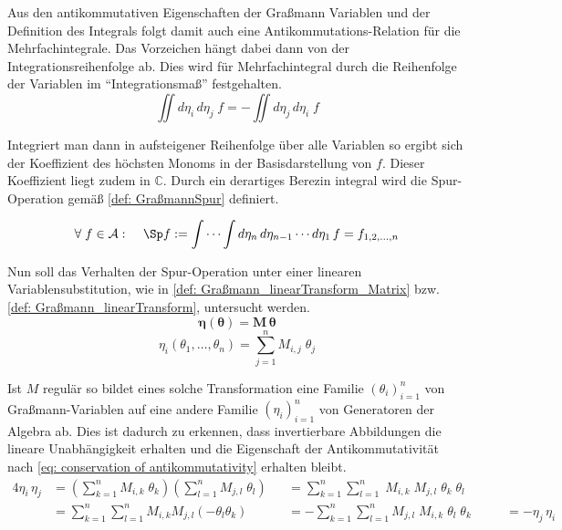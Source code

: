 \noindent Aus den antikommutativen Eigenschaften der Graßmann Variablen und der Definition des Integrals folgt damit auch eine Antikommutations-Relation für die Mehrfachintegrale. Das Vorzeichen hängt dabei dann von der Integrationsreihenfolge ab. Dies wird für Mehrfachintegral durch die Reihenfolge der Variablen im ``Integrationsmaß'' festgehalten.
\begin{equation}
\iint d \eta_{i}\, d \eta_{j}\; f = - \iint d \eta_{j}\, d \eta_{i}\; f
\end{equation}

\noindent Integriert man dann in aufsteigener Reihenfolge über alle Variablen so ergibt sich der Koeffizient des höchsten Monoms in der Basisdarstellung von $f$. Dieser Koeffizient liegt zudem in $\mathbb C$. Durch ein derartiges Berezin integral wird die Spur-Operation gemäß \eqref{def: GraßmannSpur} definiert. 
\begin{grayframe}[frametitle = {Definition: Spur-Operation}]
    \begin{equation} \label{def: GraßmannSpur}
        \forall \;f\in \mathcal A : \;\;\;\; \Sp f := \int \cdots \int d\eta_n\,d\eta_{n-1}\cdots d\eta_1\, f = f_{1,2,\dots,n}
    \end{equation}
\end{grayframe}

\noindent Nun soll das Verhalten der Spur-Operation unter einer linearen Variablensubstitution, wie in \eqref{def: Graßmann_linearTransform_Matrix} bzw. \eqref{def: Graßmann_linearTransform}, untersucht werden. 
\begin{equation} \label{def: Graßmann_linearTransform_Matrix}
    \bm{\eta}\left(\bm{\theta}\right) = \bm{M}\,\bm{\theta}
\end{equation}
\begin{equation} \label{def: Graßmann_linearTransform}
    \eta_i\left( \theta_1,\dots,\theta_n \right) = \sum_{j=1}^n M_{i,j}\; \theta_j
\end{equation}

\noindent Ist $M$ regulär so bildet eines solche Transformation eine Familie $\left(\theta_i\right)_{i = 1}^n$ von Graßmann-Variablen auf eine andere Familie $\left(\eta_i\right)_{i = 1}^n$ von Generatoren der Algebra ab. Dies ist dadurch zu erkennen, dass invertierbare Abbildungen die lineare Unabhängigkeit erhalten und die Eigenschaft der Antikommutativität nach \eqref{eq: conservation of antikommutativity} erhalten bleibt.
\begin{alignat}{4}
    \eta_i \,\eta_j 
        &= \left(\sum_{k=1}^n M_{i,k} \; \theta_k  \right) \left(\sum_{l=1}^n M_{j,l} \;\theta_l\right)     
        &&= \sum_{k=1}^n \sum_{l=1}^n\; M_{i,k}\; M_{j,l} \;\theta_k \;\theta_l &&& \nonumber \\
        &= \sum_{k=1}^n \sum_{l=1}^n M_{i,k} M_{j,l} \left(-\theta_l \theta_k \right)\
        &&= - \sum_{k=1}^n \sum_{l=1}^n M_{j,l}\; M_{i,k} \;\theta_l \;\theta_k &&&\;= - \eta_j  \,\eta_i \label{eq: conservation of antikommutativity}
\end{alignat}

